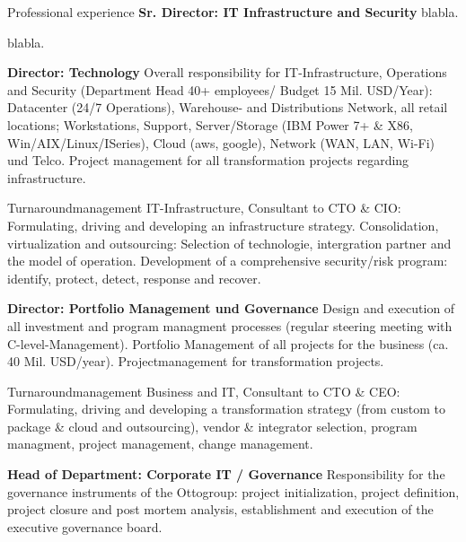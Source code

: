 \begin{rubric}{Professional experience}
\entry*[08/2015 - today] \textbf{Sr. Director: IT Infrastructure and Security}\newline
{} 
blabla.

blabla.

\entry*[04/2013 - 08/2015] \textbf{Director: Technology}\newline
{} 
Overall responsibility for IT-Infrastructure, Operations and Security (Department Head 40+ employees/ Budget 15 Mil. USD/Year): Datacenter (24/7 Operations), Warehouse- and Distributions Network, all retail locations; Workstations, Support, Server/Storage (IBM Power 7+ \& X86, Win/AIX/Linux/ISeries), Cloud (aws, google), Network (WAN, LAN, Wi-Fi) und Telco. Project management for all transformation projects regarding infrastructure.

Turnaroundmanagement IT-Infrastructure, Consultant to CTO \& CIO: Formulating, driving and developing an infrastructure strategy. Consolidation, virtualization and outsourcing: Selection of technologie, intergration partner and the model of operation. Development of a comprehensive security/risk program: identify, protect, detect, response and recover.

\entry*[10/2011 - 03/2013] \textbf{Director: Portfolio Management und Governance}\newline
{} 
Design and execution of all investment and program managment processes (regular steering meeting with C-level-Management). Portfolio Management of all projects for the business (ca. 40 Mil. USD/year). Projectmanagement for transformation projects.\axelvspace

Turnaroundmanagement Business and IT, Consultant to CTO \& CEO: Formulating, driving and developing a transformation strategy (from custom to package \& cloud and outsourcing), vendor \& integrator selection, program managment, project management, change management.\newline

\pagebreak
{}
\entry*[08/2009 - 10/2011] \textbf{Head of Department: Corporate IT / Governance}\newline
{} 
Responsibility for the governance instruments of the Ottogroup: project initialization, project definition, project closure and post mortem analysis, establishment and execution of the executive governance board.\axelvspace


\end{rubric}
